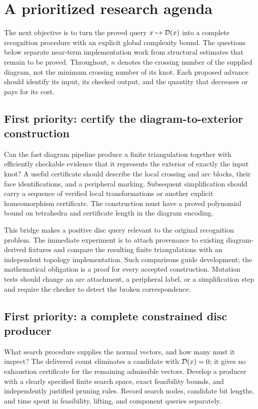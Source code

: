 \section{A prioritized research agenda}
\label{sec:research-questions}

The next objective is to turn the proved query $x\mapsto\mathcal D(x)$ into a
complete recognition procedure with an explicit global complexity bound.
The questions below separate near-term implementation work from structural
estimates that remain to be proved. Throughout, $n$ denotes the crossing
number of the supplied diagram, not the minimum crossing number of its knot.
Each proposed advance should identify its input, its checked output, and the
quantity that decreases or pays for its cost.

\subsection{First priority: certify the diagram-to-exterior construction}

Can the fast diagram pipeline produce a finite triangulation together with
efficiently checkable evidence that it represents the exterior of exactly
the input knot? A useful certificate should describe the local crossing and
arc blocks, their face identifications, and a peripheral marking. Subsequent
simplification should carry a sequence of verified local transformations or
another explicit homeomorphism certificate. The construction must have a
proved polynomial bound on tetrahedra and certificate length in the diagram
encoding.

This bridge makes a positive disc query relevant to the original recognition
problem. The immediate experiment is to attach provenance to existing
diagram-derived fixtures and compare the resulting finite triangulations
with an independent topology implementation. Such comparisons guide
development; the mathematical obligation is a proof for every accepted
construction. Mutation tests should change an arc attachment, a peripheral
label, or a simplification step and require the checker to detect the broken
correspondence.

\subsection{First priority: a complete constrained disc producer}

What search procedure supplies the normal vectors, and how many must it
inspect? The delivered count eliminates a candidate with $\mathcal D(x)=0$; it gives
no exhaustion certificate for the remaining admissible vectors. Develop a
producer with a clearly specified finite search space, exact feasibility
bounds, and independently justified pruning rules. Record search nodes,
candidate bit lengths, and time spent in feasibility, lifting, and component
queries separately.


